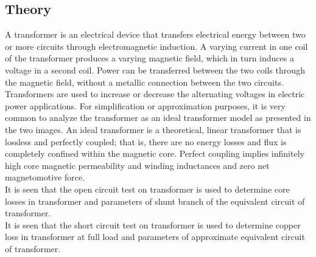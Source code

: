 \documentclass{article}
\begin{document}
\subsection{Theory}
\begin{figure}
\end{figure}
A transformer is an electrical device that transfers electrical energy between two or more circuits through electromagnetic induction. A varying current in one coil of the transformer produces a varying magnetic field, which in turn induces a voltage in a second coil. Power can be transferred between the two coils through the magnetic field, without a metallic connection between the two circuits. Transformers are used to increase or decrease the alternating voltages in electric power applications. For simplification or approximation purposes, it is very common to analyze the transformer as an ideal transformer model as presented in the two images. An ideal transformer is a theoretical, linear transformer that is lossless and perfectly coupled; that is, there are no energy losses and flux is completely confined within the magnetic core. Perfect coupling implies infinitely high core magnetic permeability and winding inductances and zero net magnetomotive force. \\

It is seen that the open circuit test on transformer is used to determine core losses in transformer and parameters of shunt branch of the equivalent circuit of transformer. \\

It is seen that the short circuit test on transformer is used to determine copper loss in transformer at full load and parameters of approximate equivalent circuit of transformer.
\newpage
\end{document}
